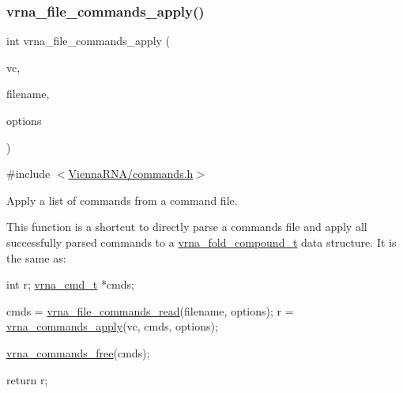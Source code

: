 \subsubsection{\texorpdfstring{vrna\+\_\+file\+\_\+commands\+\_\+apply()}{vrna\_file\_commands\_apply()}}
{\footnotesize\ttfamily int vrna\+\_\+file\+\_\+commands\+\_\+apply (\begin{DoxyParamCaption}\item[{\mbox{\hyperlink{group__fold__compound_ga1b0cef17fd40466cef5968eaeeff6166}{vrna\+\_\+fold\+\_\+compound\+\_\+t}} $\ast$}]{vc,  }\item[{const char $\ast$}]{filename,  }\item[{unsigned int}]{options }\end{DoxyParamCaption})}



{\ttfamily \#include $<$\mbox{\hyperlink{commands_8h}{Vienna\+R\+N\+A/commands.\+h}}$>$}



Apply a list of commands from a command file. 

This function is a shortcut to directly parse a commands file and apply all successfully parsed commands to a \mbox{\hyperlink{group__fold__compound_ga1b0cef17fd40466cef5968eaeeff6166}{vrna\+\_\+fold\+\_\+compound\+\_\+t}} data structure. It is the same as\+: 
\begin{DoxyCodeInclude}
  \textcolor{keywordtype}{int}         r;
  \mbox{\hyperlink{group__file__utils_structvrna__command__s}{vrna\_cmd\_t}}  *cmds;

  cmds  = \mbox{\hyperlink{group__file__utils_ga5d2a64331cff5b1059e7d327545d8a63}{vrna\_file\_commands\_read}}(filename, options);
  r     = \mbox{\hyperlink{group__file__utils_ga5e993fc4b9602af73aaaab4d3b3cd9a9}{vrna\_commands\_apply}}(vc, cmds, options);

  \mbox{\hyperlink{group__file__utils_ga926fd7632e68f3da2e2069402b80b1ab}{vrna\_commands\_free}}(cmds);

  \textcolor{keywordflow}{return} r;
\end{DoxyCodeInclude}
 
